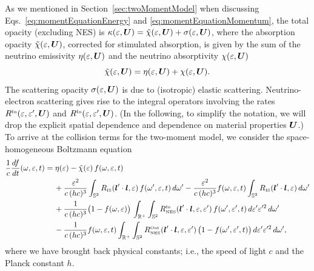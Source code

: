 \documentclass[10pt,preprint]{aastex}
\newcommand{\NES}{\mbox{\tiny NES}}
\begin{document}
As we mentioned in Section~\ref{sec:twoMomentModel} when discussing Eqs.~\eqref{eq:momentEquationEnergy} and \eqref{eq:momentEquationMomentum}, the total opacity (excluding NES) is $\kappa(\varepsilon,\boldsymbol{U})=\tilde{\chi}(\varepsilon,\boldsymbol{U})+\sigma(\varepsilon,\boldsymbol{U})$, where the absorption opacity $\tilde{\chi}(\varepsilon,\boldsymbol{U})$, corrected for stimulated absorption, is given by the sum of the neutrino emissivity $\eta(\varepsilon,\boldsymbol{U})$ and the neutrino absorptivity $\chi(\varepsilon,\boldsymbol{U})$
\begin{equation}
  \tilde{\chi}(\varepsilon,\boldsymbol{U}) = \eta(\varepsilon,\boldsymbol{U}) + \chi(\varepsilon,\boldsymbol{U}). 
\end{equation}
The scattering opacity $\sigma(\varepsilon,\boldsymbol{U})$ is due to (isotropic) elastic scattering.   
Neutrino-electron scattering gives rise to the integral operators involving the rates $R^{\mbox{\tiny In}}(\varepsilon,\varepsilon',\boldsymbol{U})$ and $R^{\mbox{\tiny In}}(\varepsilon,\varepsilon',\boldsymbol{U})$.  
(In the following, to simplify the notation, we will drop the explicit spatial dependence and dependence on material properties $\boldsymbol{U}$.)  
To arrive at the collision terms for the two-moment model, we consider the space-homogeneous Boltzmann equation \citep[e.g., Eq.~(7) in][]{mezzacappaBruenn_1993c}
\begin{align}
  \f{1}{c}\deriv{f}{t}(\omegaNu,\epsilonNu,t)
  & = \eta(\epsilonNu) - \tilde{\chi}(\epsilonNu)\,f(\omegaNu,\epsilonNu,t) \nonumber \\
  & \hspace{12pt}
  + \frac{\epsilonNu^2}{c\,(hc)^3} \int_{\bbS^{2}} R_{\IS}(\bl'\cdot\bl,\epsilonNu)\,f(\omega', \epsilonNu,t)\,d\omegaNu'
  - \frac{\epsilonNu^2}{c\,(hc)^3} f(\omegaNu,\epsilonNu,t) \int_{\bbS^{2}} R_{\IS}(\bl'\cdot\bl,\epsilonNu)\,d\omega' \nonumber \\
  & \hspace{12pt} 
  + \frac{1}{c\,(hc)^3}\big(1- f(\omegaNu,\epsilonNu)\big) \, 
  \int_{\bbR^{+}} \int_{\bbS^{2}}  R^{\In}_{\NES} (\bl'\cdot\bl,\epsilonNu,\epsilonNu')\,f(\omega',\epsilonNu',t)\,d\epsilonNu' \epsilonNu'^{2}\,d\omega' \nonumber \\
  & \hspace{12pt} 
  - \frac{1}{c\,(hc)^3} f(\omegaNu,\epsilonNu,t) \int_{\bbR^{+}} 
  \int_{\bbS^{2}}  R^{\Out}_{\NES} (\bl'\cdot\bl,\epsilonNu,\epsilonNu^{\prime})\,\big(1-f(\omegaNu',\epsilonNu',t )\big)\,d\epsilonNu' \epsilonNu'^{2}\,d\omegaNu',
  \label{eq:homogeneousBoltzmann}
\end{align}
where we have brought back physical constants; i.e., the speed of light $c$ and the Planck constant $h$.  
\end{document}
